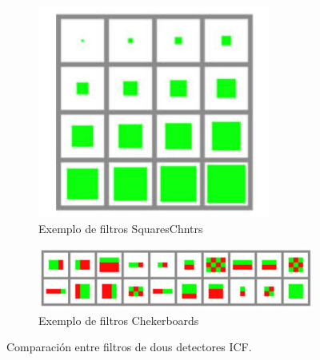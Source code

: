 \documentclass[galician]{./head/uvigo-tfg}
\begin{document}
    \begin{figure}[ht]
        \centering
        \begin{subfigure}{.5\textwidth}
          \centering
          \includegraphics[width=.4\linewidth]{figures/SquaresChntrs.PNG}
          \caption{Exemplo de filtros SquaresChntrs\cite{benenson2014ten}}
          \label{fig:squares}
        \end{subfigure}%
        \begin{subfigure}{.5\textwidth}
          \centering
          \includegraphics[width=.6\linewidth]{figures/Checkerboards.PNG}
          \caption{Exemplo de filtros Chekerboards\cite{filtered}}
          \label{fig:checkers}
        \end{subfigure}
        \caption{Comparación entre filtros de dous detectores ICF.}
        \label{fig:filters}
    \end{figure}
    
    
\end{document}
